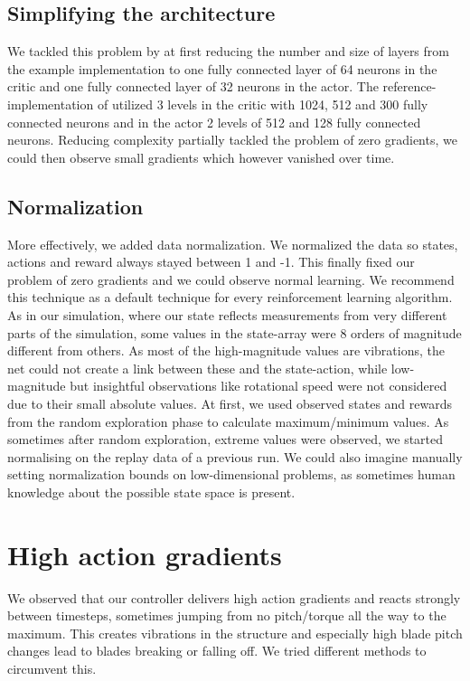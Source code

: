 \documentclass[hyperref,german,beleg]{cgvpub}
\begin{document}
\subsection{Simplifying the architecture}

We tackled this problem by at first reducing the number and size of layers from the example implementation to one fully connected layer of 64 neurons in the critic and one fully connected layer of 32 neurons in the actor. The reference-implementation of \cite{DeepDeterministicPolicy} utilized 3 levels in the critic with 1024, 512 and 300 fully connected neurons and in the actor 2 levels of 512 and 128 fully connected neurons. Reducing complexity partially tackled the problem of zero gradients, we could then observe small gradients which however vanished over time.

\subsection{Normalization}

More effectively, we added data normalization. We normalized the data so states, actions and reward always stayed between 1 and -1. This finally fixed our problem of zero gradients and we could observe normal learning. We recommend this technique as a default technique for every reinforcement learning algorithm. As in our simulation, where our state reflects measurements from very different parts of the simulation, some values in the state-array were 8 orders of magnitude different from others. As most of the high-magnitude values are vibrations, the net could not create a link between these and the state-action, while low-magnitude but insightful observations like rotational speed were not considered due to their small absolute values. At first, we used observed states and rewards from the random exploration phase to calculate maximum/minimum values. As sometimes after random exploration, extreme values were observed, we started normalising on the replay data of a previous run. We could also imagine manually setting normalization bounds on low-dimensional problems, as sometimes human knowledge about the possible state space is present.

\section{High action gradients}

We observed that our controller delivers high action gradients and reacts strongly between timesteps, sometimes jumping from no pitch/torque all the way to the maximum. This creates vibrations in the structure and especially high blade pitch changes lead to blades breaking or falling off. We tried different methods to circumvent this.
\end{document}
